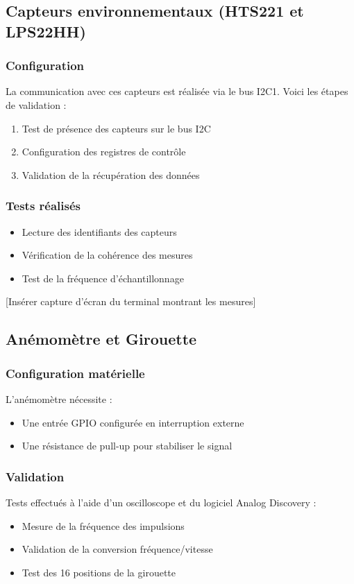 \documentclass[12pt]{article}
\begin{document}
\subsection{Capteurs environnementaux (HTS221 et LPS22HH)}
\subsubsection{Configuration}
La communication avec ces capteurs est réalisée via le bus I2C1. Voici les étapes de validation :
\begin{enumerate}
    \item Test de présence des capteurs sur le bus I2C
    \item Configuration des registres de contrôle
    \item Validation de la récupération des données
\end{enumerate}

\subsubsection{Tests réalisés}
\begin{itemize}
    \item Lecture des identifiants des capteurs
    \item Vérification de la cohérence des mesures
    \item Test de la fréquence d'échantillonnage
\end{itemize}

[Insérer capture d'écran du terminal montrant les mesures]

\subsection{Anémomètre et Girouette}
\subsubsection{Configuration matérielle}
L'anémomètre nécessite :
\begin{itemize}
    \item Une entrée GPIO configurée en interruption externe
    \item Une résistance de pull-up pour stabiliser le signal
\end{itemize}

\subsubsection{Validation}
Tests effectués à l'aide d'un oscilloscope et du logiciel Analog Discovery :
\begin{itemize}
    \item Mesure de la fréquence des impulsions
    \item Validation de la conversion fréquence/vitesse
    \item Test des 16 positions de la girouette
\end{itemize}
\end{document}
